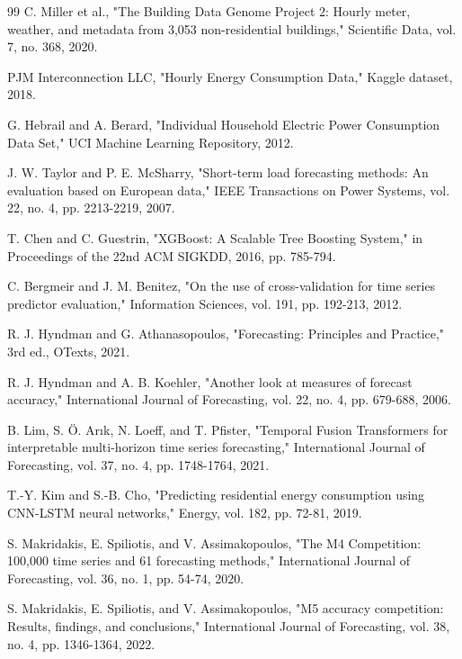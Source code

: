 \documentclass[12pt,a4paper,openany]{report}
\begin{document}

\begin{thebibliography}{99}
 C. Miller et al., "The Building Data Genome Project 2: Hourly meter, weather, and metadata from 3,053 non-residential buildings," Scientific Data, vol. 7, no. 368, 2020.

 PJM Interconnection LLC, "Hourly Energy Consumption Data," Kaggle dataset, 2018.

 G. Hebrail and A. Berard, "Individual Household Electric Power Consumption Data Set," UCI Machine Learning Repository, 2012.

 J. W. Taylor and P. E. McSharry, "Short-term load forecasting methods: An evaluation based on European data," IEEE Transactions on Power Systems, vol. 22, no. 4, pp. 2213-2219, 2007.

 T. Chen and C. Guestrin, "XGBoost: A Scalable Tree Boosting System," in Proceedings of the 22nd ACM SIGKDD, 2016, pp. 785-794.

 C. Bergmeir and J. M. Benitez, "On the use of cross-validation for time series predictor evaluation," Information Sciences, vol. 191, pp. 192-213, 2012.

 R. J. Hyndman and G. Athanasopoulos, "Forecasting: Principles and Practice," 3rd ed., OTexts, 2021.

 R. J. Hyndman and A. B. Koehler, "Another look at measures of forecast accuracy," International Journal of Forecasting, vol. 22, no. 4, pp. 679-688, 2006.

 B. Lim, S. \"O. Ar\i k, N. Loeff, and T. Pfister, "Temporal Fusion Transformers for interpretable multi-horizon time series forecasting," International Journal of Forecasting, vol. 37, no. 4, pp. 1748-1764, 2021.

 T.-Y. Kim and S.-B. Cho, "Predicting residential energy consumption using CNN-LSTM neural networks," Energy, vol. 182, pp. 72-81, 2019.

 S. Makridakis, E. Spiliotis, and V. Assimakopoulos, "The M4 Competition: 100,000 time series and 61 forecasting methods," International Journal of Forecasting, vol. 36, no. 1, pp. 54-74, 2020.

 S. Makridakis, E. Spiliotis, and V. Assimakopoulos, "M5 accuracy competition: Results, findings, and conclusions," International Journal of Forecasting, vol. 38, no. 4, pp. 1346-1364, 2022.

\end{thebibliography}
\end{document}
